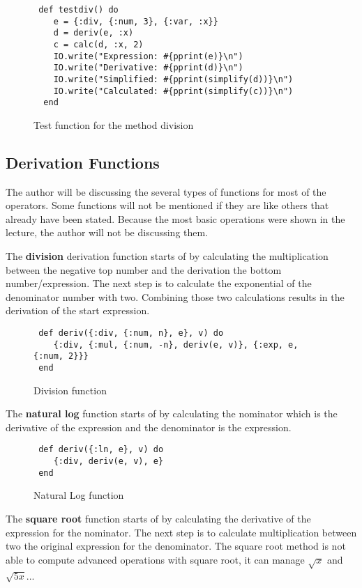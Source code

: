 \documentclass[a4paper,11pt]{article}
\begin{document}
\begin{figure}[!ht]
\begin{verbatim}
 def testdiv() do
    e = {:div, {:num, 3}, {:var, :x}}
    d = deriv(e, :x)
    c = calc(d, :x, 2)
    IO.write("Expression: #{pprint(e)}\n")
    IO.write("Derivative: #{pprint(d)}\n")
    IO.write("Simplified: #{pprint(simplify(d))}\n")
    IO.write("Calculated: #{pprint(simplify(c))}\n")
  end
\end{verbatim}
\caption{Test function for the method division}
\label{Figure:1}
\end{figure}

\subsection*{Derivation Functions}
The author will be discussing the several types of functions for most of the operators. Some functions will not be mentioned if they are like others that already have been stated. Because the most basic operations were shown in the lecture, the author will not be discussing them.

The \textbf{division} derivation function starts of by calculating the multiplication between the negative top number and the derivation the bottom number/expression. The next step is to calculate the exponential of the denominator number with two. Combining those two calculations results in the derivation of the start expression.

\begin{figure}[!ht]
\begin{verbatim}
 def deriv({:div, {:num, n}, e}, v) do
    {:div, {:mul, {:num, -n}, deriv(e, v)}, {:exp, e, {:num, 2}}}
 end
\end{verbatim}
\caption{Division function}
\label{Figure:2}
\end{figure}

The \textbf{natural log} function starts of by calculating the nominator which is the derivative of the expression and the denominator is the expression.

\begin{figure}[!ht]
\begin{verbatim}
 def deriv({:ln, e}, v) do
    {:div, deriv(e, v), e}
 end
\end{verbatim}
\caption{Natural Log function}
\label{Figure:3}
\end{figure}

The \textbf{square root} function starts of by calculating the derivative of the expression for the nominator. The next step is to calculate multiplication between two the original expression for the denominator. The square root method is not able to compute advanced operations with square root, it can manage $ \sqrt{x}$ and $ \sqrt{5x} $...
\end{document}
